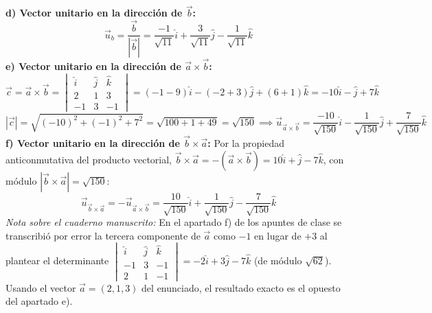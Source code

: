 \begin{ejercicio}
\begin{equation}
\end{equation}
\textbf{d) Vector unitario en la dirección de $\vec{b}$:}
\begin{equation}
    \vec{u}_b = \frac{\vec{b}}{|\vec{b}|} = \frac{-1}{\sqrt{11}}\hat{i} + \frac{3}{\sqrt{11}}\hat{j} - \frac{1}{\sqrt{11}}\hat{k}
\end{equation}
\textbf{e) Vector unitario en la dirección de $\vec{a} \times \vec{b}$:}
\begin{equation}
    \vec{c} = \vec{a} \times \vec{b} = \begin{vmatrix} \hat{i} & \hat{j} & \hat{k} \\ 2 & 1 & 3 \\ -1 & 3 & -1 \end{vmatrix} = (-1 - 9)\hat{i} - (-2 + 3)\hat{j} + (6 + 1)\hat{k} = -10\hat{i} - \hat{j} + 7\hat{k}
\end{equation}
\begin{equation}
    |\vec{c}| = \sqrt{(-10)^2 + (-1)^2 + 7^2} = \sqrt{100 + 1 + 49} = \sqrt{150} \implies \vec{u}_{\vec{a}\times\vec{b}} = \frac{-10}{\sqrt{150}}\hat{i} - \frac{1}{\sqrt{150}}\hat{j} + \frac{7}{\sqrt{150}}\hat{k}
\end{equation}
\textbf{f) Vector unitario en la dirección de $\vec{b} \times \vec{a}$:}
Por la propiedad anticonmutativa del producto vectorial, $\vec{b} \times \vec{a} = -(\vec{a} \times \vec{b}) = 10\hat{i} + \hat{j} - 7\hat{k}$, con módulo $|\vec{b}\times\vec{a}| = \sqrt{150}$:
\begin{equation}
    \vec{u}_{\vec{b}\times\vec{a}} = -\vec{u}_{\vec{a}\times\vec{b}} = \frac{10}{\sqrt{150}}\hat{i} + \frac{1}{\sqrt{150}}\hat{j} - \frac{7}{\sqrt{150}}\hat{k}
\end{equation}
\footnotesize\textit{Nota sobre el cuaderno manuscrito:} En el apartado f) de los apuntes de clase se transcribió por error la tercera componente de $\vec{a}$ como $-1$ en lugar de $+3$ al plantear el determinante $\begin{vmatrix}\hat{i}&\hat{j}&\hat{k}\\-1&3&-1\\2&1&-1\end{vmatrix} = -2\hat{i} + 3\hat{j} - 7\hat{k}$ (de módulo $\sqrt{62}$). Usando el vector $\vec{a} = (2,1,3)$ del enunciado, el resultado exacto es el opuesto del apartado e).
\end{ejercicio}

